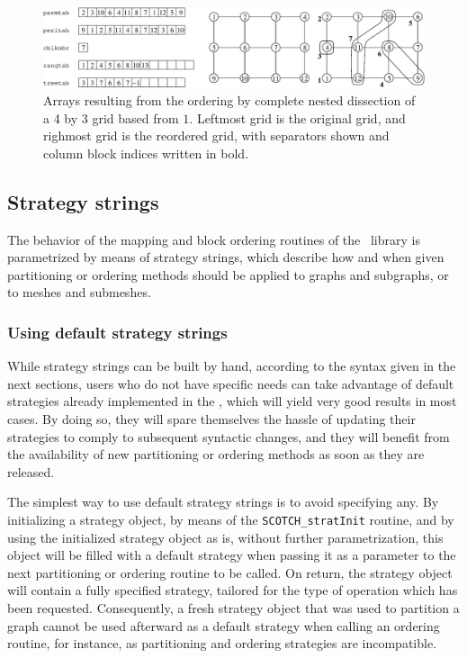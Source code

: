 \begin{figure}
\centering\includegraphics[scale=0.47]{s_f_orb.eps}
\caption{Arrays resulting from the ordering by complete nested
dissection of a 4 by 3 grid based from $1$. Leftmost grid is the
original grid, and righmost grid is the reordered grid, with
separators shown and column block indices written in bold.}
\label{fig-lib-ord-block}
\end{figure}

\subsection{Strategy strings}

The behavior of the mapping and block ordering routines of the
\libscotch\ library is parametrized by means of strategy strings,
which describe how and when given partitioning or ordering methods
should be applied to graphs and subgraphs, or to meshes and submeshes.

\subsubsection{Using default strategy strings}
\label{sec-lib-format-strat-default}

While strategy strings can be built by hand, according to the syntax
given in the next sections, users who do not have specific needs can
take advantage of default strategies already implemented in the
\libscotch, which will yield very good results in most cases. By
doing so, they will spare themselves the hassle of updating their
strategies to comply to subsequent syntactic changes, and they will
benefit from the availability of new partitioning or ordering methods
as soon as they are released.

The simplest way to use default strategy strings is to avoid
specifying any. By initializing a strategy object, by means of the
{\tt SCOTCH\_\lbt stratInit} routine, and by using the initialized
strategy object as is, without further parametrization, this object
will be filled with a default strategy when passing it as a parameter
to the next partitioning or ordering routine to be called. On return,
the strategy object will contain a fully specified strategy, tailored
for the type of operation which has been requested. Consequently, a
fresh strategy object that was used to partition a graph cannot be
used afterward as a default strategy when calling an ordering routine,
for instance, as partitioning and ordering strategies are incompatible.

